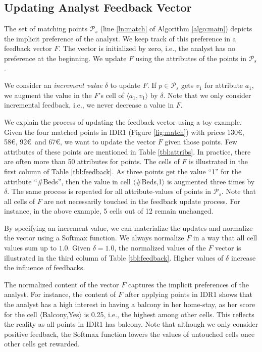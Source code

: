 \subsection{Updating Analyst Feedback Vector}
The set of matching points $\mathcal{P}_s$ (line \ref{ln:match} of Algorithm \ref{algo:main}) depicts the implicit preference of the analyst. We keep track of this preference in a feedback vector $F$. The vector is initialized by zero, i.e., the analyst has no preference at the beginning. We update $F$ using the attributes of the points in $\mathcal{P}_s$.

\vspace{2pt}
We consider an {\em increment value} $\delta$ to update $F$. If $p \in \mathcal{P}_s$ gets $v_1$ for attribute $a_1$, we augment the value in the $F$'s cell of $\langle a_1, v_1 \rangle$ by $\delta$. Note that we only consider incremental feedback, i.e., we never decrease a value in $F$.

\vspace{2pt}
We explain the process of updating the feedback vector using a toy example. Given the four matched points in IDR1 (Figure \ref{fig:match}) with prices 130\euro, 58\euro, 92\euro\ and 67\euro, we want to update the vector $F$ given those points. Few attributes of these points are mentioned in Table \ref{tbl:attribs}. In practice, there are often more than 50 attributes for points. The cells of $F$ is illustrated in the first column of Table \ref{tbl:feedback}. As three points get the value ``1'' for the attribute ``\#Beds'', then the value in cell $\langle$\#Beds,1$\rangle$ is augmented three times by $\delta$. The same process is repeated for all attribute-values of points in $\mathcal{P}_s$. Note that all cells of $F$ are not necessarily touched in the feedback update process. For instance, in the above example, 5 cells out of 12 remain unchanged.

\vspace{2pt}
By specifying an increment value, we can materialize the updates and normalize the vector using a Softmax function. We always normalize $F$ in a way that all cell values sum up to $1.0$. Given $\delta = 1.0$, the normalized values of the $F$ vector is illustrated in the third column of Table \ref{tbl:feedback}. Higher values of $\delta$ increase the influence of feedbacks.

\vspace{2pt}
The normalized content of the vector $F$ captures the implicit preferences of the analyst. For instance, the content of $F$ after applying points in IDR1 shows that the analyst has a high interest in having a balcony in her home-stay, as her score for the cell $\langle$Balcony,Yes$\rangle$ is 0.25, i.e., the highest among other cells. This reflects the reality as all points in IDR1 has balcony. Note that although we only consider positive feedback, the Softmax function lowers the values of untouched cells once other cells get rewarded.

